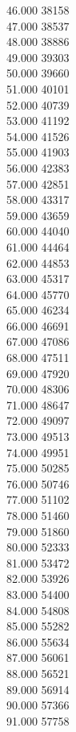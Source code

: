 { 46.000	38158 \\
 47.000	38537 \\
 48.000	38886 \\
 49.000	39303 \\
 50.000	39660 \\
 51.000	40101 \\
 52.000	40739 \\
 53.000	41192 \\
 54.000	41526 \\
 55.000	41903 \\
 56.000	42383 \\
 57.000	42851 \\
 58.000	43317 \\
 59.000	43659 \\
 60.000	44040 \\
 61.000	44464 \\
 62.000	44853 \\
 63.000	45317 \\
 64.000	45770 \\
 65.000	46234 \\
 66.000	46691 \\
 67.000	47086 \\
 68.000	47511 \\
 69.000	47920 \\
 70.000	48306 \\
 71.000	48647 \\
 72.000	49097 \\
 73.000	49513 \\
 74.000	49951 \\
 75.000	50285 \\
 76.000	50746 \\
 77.000	51102 \\
 78.000	51460 \\
 79.000	51860 \\
 80.000	52333 \\
 81.000	53472 \\
 82.000	53926 \\
 83.000	54400 \\
 84.000	54808 \\
 85.000	55282 \\
 86.000	55634 \\
 87.000	56061 \\
 88.000	56521 \\
 89.000	56914 \\
 90.000	57366 \\
 91.000	57758 \\
}

